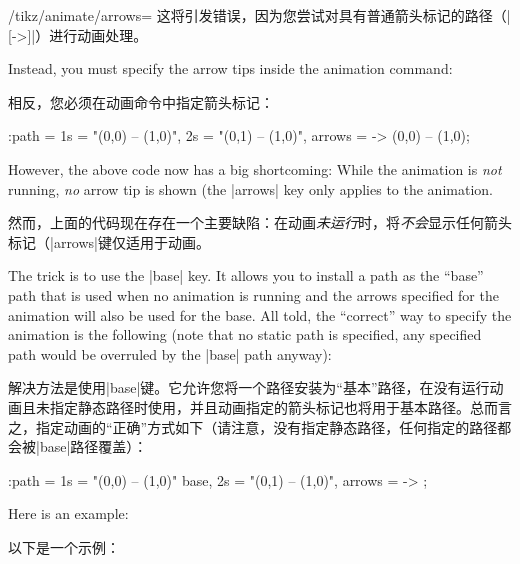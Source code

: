 \begin{key}{/tikz/animate/arrows=}
    这将引发错误，因为您尝试对具有普通箭头标记的路径（|[->]|）进行动画处理。



    Instead, you must specify the arrow tips inside the animation command:
    
    相反，您必须在动画命令中指定箭头标记：


\begin{codeexample}
\draw :path = { 1s = "{(0,0) -- (1,0)}", 2s = "{(0,1) -- (1,0)}", arrows = -> }
  (0,0) -- (1,0);
\end{codeexample}

    However, the above code now has a big shortcoming: While the animation is
    \emph{not} running, \emph{no} arrow tip is shown (the |arrows| key only
    applies to the animation.

    然而，上面的代码现在存在一个主要缺陷：在动画\emph{未运行}时，将\emph{不会}显示任何箭头标记（|arrows|键仅适用于动画。



    The trick is to use the |base| key. It allows you to install a path as the
    ``base'' path that is used when no animation is running and the arrows
    specified for the animation will also be used for the base. All told, the
    ``correct'' way to specify the animation is the following (note that no
    static path is specified, any specified path would be overruled by the
    |base| path anyway):
    
    解决方法是使用|base|键。它允许您将一个路径安装为“基本”路径，在没有运行动画且未指定静态路径时使用，并且动画指定的箭头标记也将用于基本路径。总而言之，指定动画的“正确”方式如下（请注意，没有指定静态路径，任何指定的路径都会被|base|路径覆盖）：


\begin{codeexample}
\draw :path = { 1s = "{(0,0) -- (1,0)}" base, 2s = "{(0,1) -- (1,0)}", arrows = -> };
\end{codeexample}

    Here is an example:
    
    以下是一个示例：


\begin{codeexample}[
    preamble={\usetikzlibrary{animations}},
    animation list={0.5,1,1.5,2},
    animation bb={(-0.1,-0.1) rectangle (1.1,1.1)},
]
\end{codeexample}
\end{key}

